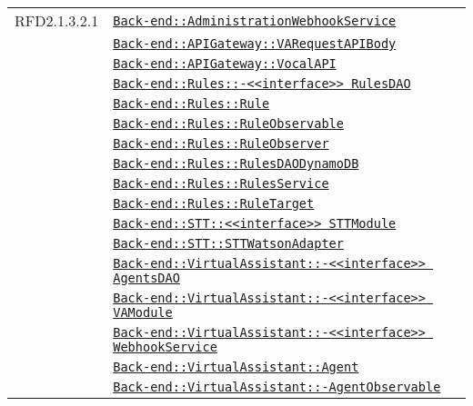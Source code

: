 \begin{longtable}{|>{\centering}m{3cm}|m{10cm}<{\centering}|}
RFD2.1.3.2.1 & \hyperref[Back-end::AdministrationWebhookService]{\texttt{Back-end::AdministrationWebhookService}}\\
& \hyperref[Back-end::APIGateway::VARequestAPIBody]{\texttt{Back-end::APIGateway::VARequestAPIBody}}\\
& \hyperref[Back-end::APIGateway::VocalAPI]{\texttt{Back-end::APIGateway::VocalAPI}}\\
& \hyperref[Back-end::Rules::<<interface>> RulesDAO]{\texttt{Back-end::Rules::-\linebreak <<interface>> RulesDAO}}\\
& \hyperref[Back-end::Rules::Rule]{\texttt{Back-end::Rules::Rule}}\\
& \hyperref[Back-end::Rules::RuleObservable]{\texttt{Back-end::Rules::RuleObservable}}\\
& \hyperref[Back-end::Rules::RuleObserver]{\texttt{Back-end::Rules::RuleObserver}}\\
& \hyperref[Back-end::Rules::RulesDAODynamoDB]{\texttt{Back-end::Rules::RulesDAODynamoDB}}\\
& \hyperref[Back-end::Rules::RulesService]{\texttt{Back-end::Rules::RulesService}}\\
& \hyperref[Back-end::Rules::RuleTarget]{\texttt{Back-end::Rules::RuleTarget}}\\
& \hyperref[Back-end::STT::<<interface>> STTModule]{\texttt{Back-end::STT::<<interface>> STTModule}}\\
& \hyperref[Back-end::STT::STTWatsonAdapter]{\texttt{Back-end::STT::STTWatsonAdapter}}\\
& \hyperref[Back-end::VirtualAssistant::<<interface>> AgentsDAO]{\texttt{Back-end::VirtualAssistant::-\linebreak <<interface>> AgentsDAO}}\\
& \hyperref[Back-end::VirtualAssistant::<<interface>> VAModule]{\texttt{Back-end::VirtualAssistant::-\linebreak <<interface>> VAModule}}\\
& \hyperref[Back-end::VirtualAssistant::<<interface>> WebhookService]{\texttt{Back-end::VirtualAssistant::-\linebreak <<interface>> WebhookService}}\\
& \hyperref[Back-end::VirtualAssistant::Agent]{\texttt{Back-end::VirtualAssistant::Agent}}\\
& \hyperref[Back-end::VirtualAssistant::AgentObservable]{\texttt{Back-end::VirtualAssistant::-\linebreak AgentObservable}}\\

\end{longtable}
